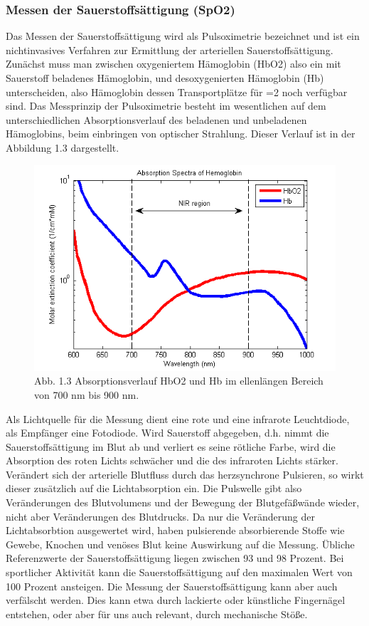 \subsubsection{Messen der Sauerstoffs{\"a}ttigung (SpO2)} \label{grund-spo2-subsubsec}


Das Messen der Sauerstoffsättigung wird als Pulsoximetrie bezeichnet und ist ein nichtinvasives Verfahren zur Ermittlung der arteriellen Sauerstoffsättigung. Zunächst muss man zwischen oxygeniertem Hämoglobin (HbO2) also ein mit Sauerstoff beladenes Hämoglobin, und desoxygenierten Hämoglobin (Hb) unterscheiden, also Hämoglobin dessen Transportplätze für =2 noch verfügbar sind. Das Messprinzip der Pulsoximetrie besteht im wesentlichen auf dem unterschiedlichen Absorptionsverlauf des beladenen und unbeladenen Hämoglobins, beim einbringen von optischer Strahlung. Dieser Verlauf ist in der Abbildung 1.3 dargestellt.

\begin{figure}[H] \centering
\includegraphics[width=\textwidth]{Images/elise_abs-Sauerstoff.png} 
\vspace{-0.3cm} 
\caption{Abb. 1.3 Absorptionsverlauf HbO2 und Hb im ellenlängen Bereich von 700 nm bis 900 nm.}
\label{fig-elise} 
\end{figure}

Als Lichtquelle für die Messung dient eine rote und eine infrarote Leuchtdiode, als Empfänger
eine Fotodiode. Wird Sauerstoff abgegeben, d.h. nimmt die Sauerstoffsättigung im Blut ab
und verliert es seine rötliche Farbe, wird die Absorption des roten Lichts schwächer und die
des infraroten Lichts stärker. Verändert sich der arterielle Blutfluss durch das herzsynchrone Pulsieren, so wirkt dieser zusätzlich auf die Lichtabsorption ein. Die Pulswelle gibt also Veränderungen des Blutvolumens und der Bewegung der Blutgefäßwände wieder, nicht aber Veränderungen des Blutdrucks.  Da nur die Veränderung der Lichtabsorbtion ausgewertet wird, haben pulsierende absorbierende Stoffe wie Gewebe, Knochen und venöses Blut keine Auswirkung auf die Messung. Übliche Referenzwerte der Sauerstoffsättigung liegen zwischen 93 und 98 Prozent. Bei sportlicher Aktivität kann die Sauerstoffsättigung auf den maximalen Wert von 100 Prozent ansteigen. Die Messung der Sauerstoffsättigung kann aber auch verfälscht werden. Dies kann etwa durch lackierte oder künstliche Fingernägel entstehen, oder aber für uns auch relevant, durch mechanische Stöße.  
